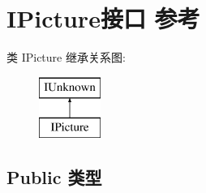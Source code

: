 \hypertarget{interface_i_picture}{}\section{I\+Picture接口 参考}
\label{interface_i_picture}
类 I\+Picture 继承关系图\+:\begin{figure}[H]
\begin{center}
\leavevmode
\includegraphics[height=2.000000cm]{interface_i_picture}
\end{center}
\end{figure}
\subsection*{Public 类型}
